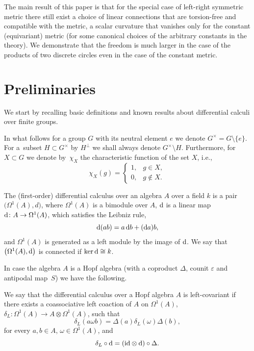 \documentclass[10pt,a4paper]{amsart}
\numberwithin{equation}{section}
\begin{document}
The main result of this paper is that for the special case of left-right symmetric metric there still exist a choice
of linear connections that are torsion-free and compatible with the metric, a scalar curvature that vanishes
only for the constant (equivariant) metric (for some canonical choices of the arbitrary constants in the theory).
We demonstrate that the freedom is much larger in the case of the products of two discrete circles even in the
case of the constant metric.

\section{Preliminaries}

We start by recalling basic definitions and known results about differential calculi over finite groups.

In what follows for a group $G$ with its neutral element $e$ we denote
$G^\times = G \setminus \{e\}$. For a~subset $H \subset G^\times$ by $H^\perp$ we shall always
denote $G^\times \setminus H$. Furthermore, for $X \subset G$ we denote by~$\chi_X$
the characteristic function of the set $X$, i.e.,
\[
\chi_X(g)=\begin{cases}1, & g\in X, \\
0, & g\not\in X.\end{cases}
\]

\begin{Definition}The (first-order) differential calculus over an algebra $A$ over a field $k$ is a pair $\big(\Omega^1(A), d\big)$, where
$\Omega^1(A)$ is a bimodule over $A$, ${\rm d}$ is a linear map ${\rm d}\colon A\rightarrow \Omega^1(A)$, which satisfies the Leibniz rule,
\begin{equation*}
{\rm d}(ab)=a\, {\rm d}b+({\rm d}a) b,
\end{equation*}
and $\Omega^1(A)$ is generated as a left module by the image of ${\rm d}$. We say
that $\big(\Omega^1(A),{\rm d}\big)$ is connected if $\ker {\rm d} \cong k$.
\end{Definition}
In case the algebra $A$ is a Hopf algebra (with a coproduct $\Delta$, counit $\varepsilon$ and antipodal map~$S$) we have the following.
\begin{Definition}
We say that the differential calculus over a Hopf algebra $A$ is left-covariant if there exists a coassociative left coaction of
$A$ on $\Omega^1(A)$, $\delta_{L}\colon \Omega^1(A) \rightarrow A \otimes \Omega^1(A)$, such that
\begin{equation*}
\delta_{L}(a\omega b)=\Delta(a)\delta_L(\omega)\Delta(b),
\end{equation*}
for every $a,b\in A$, $\omega\in\Omega^1(A)$, and
\begin{equation*}
\delta_{L}\circ {\rm d} =(\mathrm{id}\otimes {\rm d})\circ \Delta.
\end{equation*}
\end{Definition}
\end{document}
